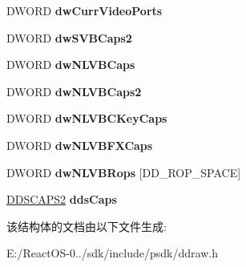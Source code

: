 \begin{DoxyCompactItemize}
D\+W\+O\+RD {\bfseries dw\+Curr\+Video\+Ports}
\item 
\mbox{\label{struct___d_d_c_a_p_s___d_x7_a4c233cb0f15f3ff1317dd33ebdfb44ae}} 
D\+W\+O\+RD {\bfseries dw\+S\+V\+B\+Caps2}
\item 
\mbox{\label{struct___d_d_c_a_p_s___d_x7_a96346df6fe266a921fea1ea255e9d5fe}} 
D\+W\+O\+RD {\bfseries dw\+N\+L\+V\+B\+Caps}
\item 
\mbox{\label{struct___d_d_c_a_p_s___d_x7_a49c3b0b3cec06290a5ea2dfcdbba6e02}} 
D\+W\+O\+RD {\bfseries dw\+N\+L\+V\+B\+Caps2}
\item 
\mbox{\label{struct___d_d_c_a_p_s___d_x7_ad573d4fddb1153049ac22eec24426ed8}} 
D\+W\+O\+RD {\bfseries dw\+N\+L\+V\+B\+C\+Key\+Caps}
\item 
\mbox{\label{struct___d_d_c_a_p_s___d_x7_a77c4672b5b9819a1f3ead97d9b812b30}} 
D\+W\+O\+RD {\bfseries dw\+N\+L\+V\+B\+F\+X\+Caps}
\item 
\mbox{\label{struct___d_d_c_a_p_s___d_x7_ae9923bde5efd31ccc4f635f98d7e7a31}} 
D\+W\+O\+RD {\bfseries dw\+N\+L\+V\+B\+Rops} \mbox{[}D\+D\+\_\+\+R\+O\+P\+\_\+\+S\+P\+A\+CE\mbox{]}
\item 
\mbox{\label{struct___d_d_c_a_p_s___d_x7_a366732300136bff214c5f5c92493330b}} 
\hyperlink{struct___d_d_s_c_a_p_s2}{D\+D\+S\+C\+A\+P\+S2} {\bfseries dds\+Caps}
\end{DoxyCompactItemize}


该结构体的文档由以下文件生成\+:\begin{DoxyCompactItemize}
\item 
E\+:/\+React\+O\+S-\/0../sdk/include/psdk/ddraw.\+h\end{DoxyCompactItemize}
